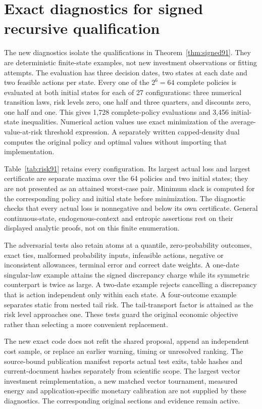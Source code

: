 \section{Exact diagnostics for signed recursive qualification}\label{app:evidence91}
The new diagnostics isolate the qualifications in Theorem~\ref{thm:signed91}. They are deterministic finite-state examples, not new investment observations or fitting attempts. The evaluation has three decision dates, two states at each date and two feasible actions per state. Every one of the $2^6=64$ complete policies is evaluated at both initial states for each of 27 configurations: three numerical transition laws, risk levels zero, one half and three quarters, and discounts zero, one half and one. This gives 1,728 complete-policy evaluations and 3,456 initial-state inequalities. Numerical action values use exact minimization of the average-value-at-risk threshold expression. A separately written capped-density dual computes the original policy and optimal values without importing that implementation.

Table~\ref{tab:risk91} retains every configuration. Its largest actual loss and largest certificate are separate maxima over the 64 policies and two initial states; they are not presented as an attained worst-case pair. Minimum slack is computed for the corresponding policy and initial state before minimization. The diagnostic checks that every actual loss is nonnegative and below its own certificate. General continuous-state, endogenous-context and entropic assertions rest on their displayed analytic proofs, not on this finite enumeration.


The adversarial tests also retain atoms at a quantile, zero-probability outcomes, exact ties, malformed probability inputs, infeasible actions, negative or inconsistent allowances, terminal error and correct date weights. A one-date singular-law example attains the signed discrepancy charge while its symmetric counterpart is twice as large. A two-date example rejects cancelling a discrepancy that is action independent only within each state. A four-outcome example separates static from nested tail risk. The tail-transport factor is attained as the risk level approaches one. These tests guard the original economic objective rather than selecting a more convenient replacement.

The new exact code does not refit the shared proposal, append an independent cost sample, or replace an earlier warning, timing or unresolved ranking. The source-bound publication manifest reports actual test exits, table hashes and current-document hashes separately from scientific scope. The largest vector investment reimplementation, a new matched vector tournament, measured energy and application-specific monetary calibration are not supplied by these diagnostics. The corresponding original sections and evidence remain active.
